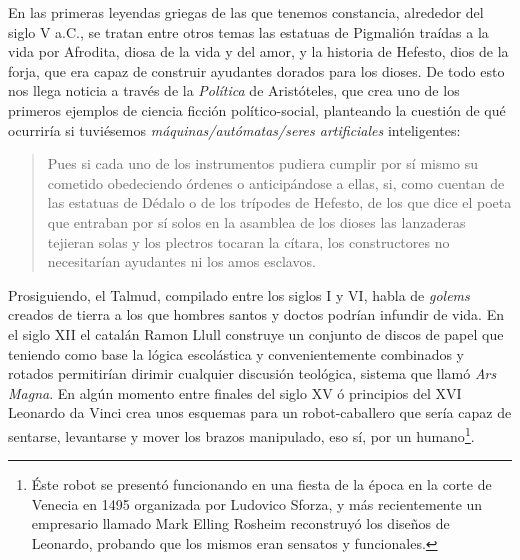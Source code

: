 \documentclass[12pt]{memoir}
\begin{document}
En las primeras leyendas griegas de las que tenemos constancia, alrededor del siglo V a.C., se tratan entre otros temas las estatuas de Pigmalión traídas a la vida por Afrodita, diosa de la vida y del amor, y la historia de Hefesto, dios de la forja, que era capaz de construir ayudantes dorados para los dioses. De todo esto nos llega noticia a través de la \textit{Política} de Aristóteles, que crea uno de los primeros ejemplos de ciencia ficción político-social, planteando la cuestión de qué ocurriría si tuviésemos \textit{máquinas/autómatas/seres artificiales} inteligentes:

\blockquote{Pues si cada uno de los instrumentos pudiera cumplir por sí mismo su cometido obedeciendo órdenes o anticipándose a ellas, si, como cuentan de las estatuas de Dédalo o de los trípodes de Hefesto, de los que dice el poeta que entraban por sí solos en la asamblea de los dioses las lanzaderas tejieran solas y los plectros tocaran la cítara, los constructores no necesitarían ayudantes ni los amos esclavos. \parencite[Aristot. Pol. 1.1253b]{aristotlePolitics}}

Prosiguiendo, el Talmud, compilado entre los siglos I y VI, habla de \textit{golems} creados de tierra a los que hombres santos y doctos podrían infundir de vida. En el siglo XII el catalán Ramon Llull construye un conjunto de discos de papel que teniendo como base la lógica escolástica y convenientemente combinados y rotados permitirían dirimir cualquier discusión teológica, sistema que llamó \textit{Ars Magna}. En algún momento entre finales del siglo XV ó principios del XVI Leonardo da Vinci crea unos esquemas para un robot-caballero que sería capaz de sentarse, levantarse y mover los brazos manipulado, eso sí, por un humano\footnote{Éste robot se presentó funcionando en una fiesta de la época en la corte de Venecia en 1495 organizada por Ludovico Sforza, y más recientemente un empresario llamado Mark Elling Rosheim reconstruyó los diseños de Leonardo, probando que los mismos eran sensatos y funcionales.}. 
\end{document}

